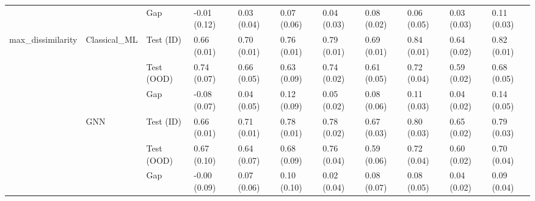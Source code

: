 \begin{tabular}{lllllllllll}
 &  & Gap & -0.01 (0.12) & 0.03 (0.04) & 0.07 (0.06) & 0.04 (0.03) & 0.08 (0.02) & 0.06 (0.05) & 0.03 (0.03) & 0.11 (0.03) \\
\cline{1-11} \cline{2-11}
\multirow[t]{6}{*}{max_dissimilarity} & \multirow[t]{3}{*}{Classical_ML} & Test (ID) & 0.66 (0.01) & 0.70 (0.01) & 0.76 (0.01) & 0.79 (0.01) & 0.69 (0.01) & 0.84 (0.01) & 0.64 (0.02) & 0.82 (0.01) \\
 &  & Test (OOD) & 0.74 (0.07) & 0.66 (0.05) & 0.63 (0.09) & 0.74 (0.02) & 0.61 (0.05) & 0.72 (0.04) & 0.59 (0.02) & 0.68 (0.05) \\
 &  & Gap & -0.08 (0.07) & 0.04 (0.05) & 0.12 (0.09) & 0.05 (0.02) & 0.08 (0.06) & 0.11 (0.03) & 0.04 (0.02) & 0.14 (0.05) \\
\cline{2-11}
 & \multirow[t]{3}{*}{GNN} & Test (ID) & 0.66 (0.01) & 0.71 (0.01) & 0.78 (0.01) & 0.78 (0.02) & 0.67 (0.03) & 0.80 (0.03) & 0.65 (0.02) & 0.79 (0.03) \\
 &  & Test (OOD) & 0.67 (0.10) & 0.64 (0.07) & 0.68 (0.09) & 0.76 (0.04) & 0.59 (0.06) & 0.72 (0.04) & 0.60 (0.02) & 0.70 (0.04) \\
 &  & Gap & -0.00 (0.09) & 0.07 (0.06) & 0.10 (0.10) & 0.02 (0.04) & 0.08 (0.07) & 0.08 (0.05) & 0.04 (0.02) & 0.09 (0.04) \\
\cline{1-11} \cline{2-11}
\bottomrule
\end{tabular}
